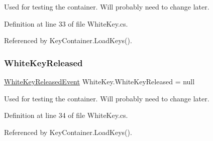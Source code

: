 Used for testing the container. Will probably need to change later. 



Definition at line 33 of file White\+Key.\+cs.



Referenced by Key\+Container.\+Load\+Keys().

\mbox{\label{group___white_key_events_ga180e88cd7ab95af43231f53469e87830}} 
\subsubsection{\texorpdfstring{White\+Key\+Released}{WhiteKeyReleased}}
{\footnotesize\ttfamily \hyperlink{group___white_key_event_types_class_white_key_1_1_white_key_released_event}{White\+Key\+Released\+Event} White\+Key.\+White\+Key\+Released = null}



Used for testing the container. Will probably need to change later. 



Definition at line 34 of file White\+Key.\+cs.



Referenced by Key\+Container.\+Load\+Keys().

